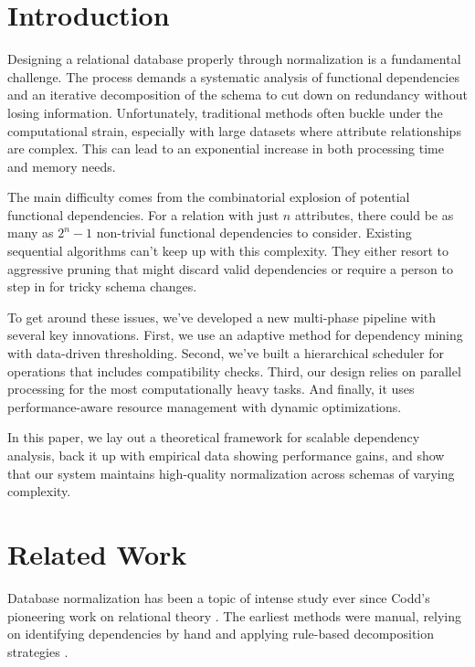 \documentclass[sigconf]{acmart}
\begin{document}
\maketitle

\section{Introduction}

Designing a relational database properly through normalization is a fundamental challenge. The process demands a systematic analysis of functional dependencies and an iterative decomposition of the schema to cut down on redundancy without losing information. Unfortunately, traditional methods often buckle under the computational strain, especially with large datasets where attribute relationships are complex. This can lead to an exponential increase in both processing time and memory needs.

The main difficulty comes from the combinatorial explosion of potential functional dependencies. For a relation with just $n$ attributes, there could be as many as $2^n - 1$ non-trivial functional dependencies to consider. Existing sequential algorithms can't keep up with this complexity. They either resort to aggressive pruning that might discard valid dependencies or require a person to step in for tricky schema changes.

To get around these issues, we've developed a new multi-phase pipeline with several key innovations. First, we use an adaptive method for dependency mining with data-driven thresholding. Second, we've built a hierarchical scheduler for operations that includes compatibility checks. Third, our design relies on parallel processing for the most computationally heavy tasks. And finally, it uses performance-aware resource management with dynamic optimizations.

In this paper, we lay out a theoretical framework for scalable dependency analysis, back it up with empirical data showing performance gains, and show that our system maintains high-quality normalization across schemas of varying complexity.

\section{Related Work}

Database normalization has been a topic of intense study ever since Codd's pioneering work on relational theory \cite{codd1970relational}. The earliest methods were manual, relying on identifying dependencies by hand and applying rule-based decomposition strategies \cite{bernstein1976computational}.
\end{document}
